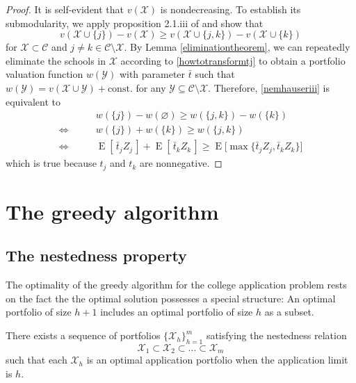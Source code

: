 \begin{proof}
It is self-evident that $v(\mathcal{X})$ is nondecreasing. To establish its submodularity, we apply proposition 2.1.iii of \cite{nemhauserandwolsey1978} and show that
\begin{equation}\label{nemhauseriii}
v(\mathcal{X} \cup \{j\}) - v(\mathcal{X}) \geq 
v(\mathcal{X} \cup \{j, k\}) - v(\mathcal{X} \cup \{k\})
\end{equation}
for $\mathcal{X} \subset \mathcal{C}$ and $j \neq k \in \mathcal{C} \setminus \mathcal{X}$. By Lemma \ref{eliminationtheorem}, we can repeatedly eliminate the schools in $\mathcal{X}$ according to \eqref{howtotransformtj} to obtain a portfolio valuation function $w(\mathcal{Y})$ with parameter $\bar t$ such that $w(\mathcal{Y}) = v(\mathcal{X} \cup \mathcal{Y}) + \text{const.}$ for any $\mathcal{Y} \subseteq \mathcal{C} \setminus \mathcal{X}$. Therefore, \eqref{nemhauseriii} is equivalent to
\begin{align*}
& w(\{j\}) - w(\varnothing) \geq w(\{j, k\}) - w(\{k\}) \\
\iff \qquad &w(\{j\})  +  w(\{k\})  \geq w(\{j, k\})  \\
\iff \qquad &\operatorname{E}[\,\bar t_j Z_j\,] + \operatorname{E}[\,\bar t_k Z_k\,] 
\geq \operatorname{E}\bigl[\max\{ \bar t_j Z_j, \bar t_k Z_k \} \bigr]
\end{align*}
which is true because $t_j$ and $t_k$ are nonnegative.
\end{proof}











\section{The greedy algorithm} \label{sectionGreedy}

\subsection{The nestedness property} 
The optimality of the greedy algorithm for the college application problem rests on the fact the the optimal solution possesses a special structure: An optimal portfolio of size $h+1$ includes an optimal portfolio of size $h$ as a subset.

\begin{theorem} \label{nestedapplication}
There exists a sequence of portfolios $\{\mathcal{X}_h\}_{h=1}^m$ satisfying the nestedness relation
\begin{equation*}
\mathcal{X}_1 \subset \mathcal{X}_2\subset \dots \subset \mathcal{X}_m
\end{equation*}
such that each $\mathcal{X}_h$ is an optimal application portfolio when the application limit is $h$.
\end{theorem}


